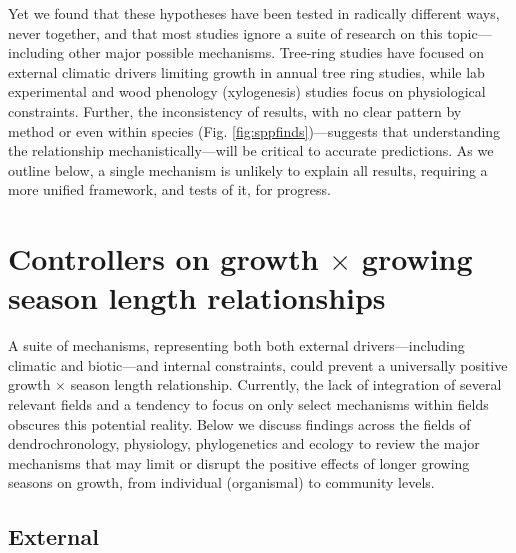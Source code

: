 \documentclass[11pt]{article}
\begin{document}
Yet we found that these hypotheses have been tested in radically different ways, never together, and that most studies ignore a suite of research on this topic---including other major possible mechanisms. Tree-ring studies have focused on external climatic drivers limiting growth in annual tree ring studies, while lab experimental and wood phenology (xylogenesis) studies focus on physiological constraints. Further, the inconsistency of results, with no clear pattern by method or even within species (Fig. \ref{fig:sppfinds})---suggests that understanding the relationship mechanistically---will be critical to accurate predictions. As we outline below, a single mechanism is unlikely to explain all results, requiring a more unified framework, and tests of it, for progress. 
 
\section*{Controllers on growth $\times$ growing season length relationships}

A suite of mechanisms, representing both both external drivers---including climatic and biotic---and internal constraints, could prevent a universally positive growth $\times$ season length relationship. Currently, the lack of integration of several relevant fields and a tendency to focus on only select mechanisms within fields obscures this potential reality. Below we discuss findings across the fields of dendrochronology, physiology, phylogenetics and ecology to review the major mechanisms that may limit or disrupt the positive effects of longer growing seasons on growth, from individual (organismal) to community levels. 

\subsection*{External}
\end{document}
